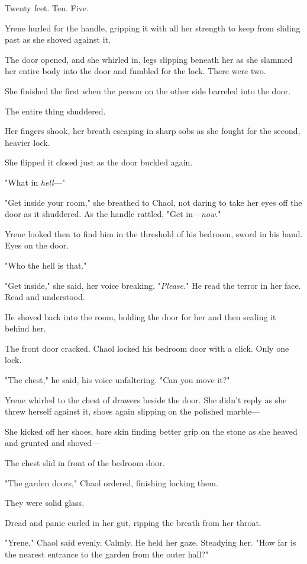 Twenty feet.
Ten.
Five.

Yrene hurled for the handle, gripping it with all her strength to keep from sliding past as she shoved against it.

The door opened, and she whirled in, legs slipping beneath her as she slammed her entire body into the door and fumbled for the lock.
There were two.

She finished the first when the person on the other side barreled into the door.

The entire thing shuddered.

Her fingers shook, her breath escaping in sharp sobs as she fought for the second, heavier lock.

She flipped it closed just as the door buckled again.

"What in \emph{hell}---"

"Get inside your room," she breathed to Chaol, not daring to take her eyes off the door as it shuddered.
As the handle rattled.
"Get in---\emph{now}."

Yrene looked then to find him in the threshold of his bedroom, sword in his hand.
Eyes on the door.

"Who the hell is that."

"Get inside," she said, her voice breaking.
"\emph{Please.}" He read the terror in her face.
Read and understood.

He shoved back into the room, holding the door for her and then sealing it behind her.

The front door cracked.
Chaol locked his bedroom door with a click.
Only one lock.

"The chest," he said, his voice unfaltering.
"Can you move it?"

Yrene whirled to the chest of drawers beside the door.
She didn't reply as she threw herself against it, shoes again slipping on the polished marble---

She kicked off her shoes, bare skin finding better grip on the stone as she heaved and grunted and shoved---

The chest slid in front of the bedroom door.

"The garden doors," Chaol ordered, finishing locking them.

They were solid glass.

Dread and panic curled in her gut, ripping the breath from her throat.

"Yrene," Chaol said evenly.
Calmly.
He held her gaze.
Steadying her.
"How far is the nearest entrance to the garden from the outer hall?"


